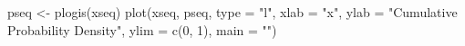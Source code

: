 \begin{Schunk}
\begin{Sinput}
 pseq <- plogis(xseq)
 plot(xseq, pseq, type = "l", xlab = "x", ylab = "Cumulative Probability Density", 
      ylim = c(0, 1), main = "")
\end{Sinput}
\end{Schunk}
